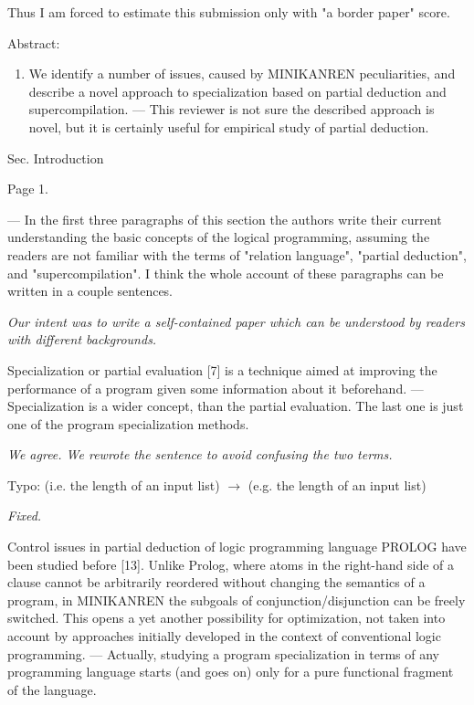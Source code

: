 Thus I am forced to estimate this submission only with "a border paper" score.


Abstract:
\begin{enumerate}
  \item  We identify a number of issues, caused by MINIKANREN peculiarities, and describe a novel approach to specialization based on partial deduction and supercompilation.
  --- This reviewer is not sure the described approach is novel, but it is certainly useful for empirical study of partial deduction.
\end{enumerate}

Sec. Introduction

Page 1.
\begin{enumerate}
  \setcounter{enumi}{1}
  \item{--- In the first three paragraphs of this section the authors write their current understanding the basic concepts of the logical programming, assuming the readers are not familiar with the terms of  "relation language", "partial deduction", and "supercompilation". I think the whole account of these paragraphs can be written in a couple sentences.

  \emph{Our intent was to write a self-contained paper which can be understood by readers with different backgrounds.}}

  \item{Specialization or partial evaluation [7] is a technique aimed at improving the performance of a program given some information about it beforehand.
  --- Specialization is a wider concept, than the partial evaluation. The last one is just one of the program specialization methods.

  \emph{We agree. We rewrote the sentence to avoid confusing the two terms.}}

  \item{Typo:
  (i.e. the length of an input list) $\to$ (e.g. the length of an input list)

  \emph{Fixed.}

  \item{Control issues in partial deduction of logic programming language PROLOG have been studied before [13]. Unlike Prolog, where atoms in the right-hand side of a clause cannot be arbitrarily reordered without changing the semantics of a program, in MINIKANREN the subgoals of conjunction/disjunction can be freely switched. This opens a yet another possibility for optimization, not taken into account by approaches initially developed in the context of conventional logic programming.
  --- Actually, studying a program specialization in terms of any programming language starts (and goes on) only for a pure functional fragment of the language.
  }
  }

\end{enumerate}

